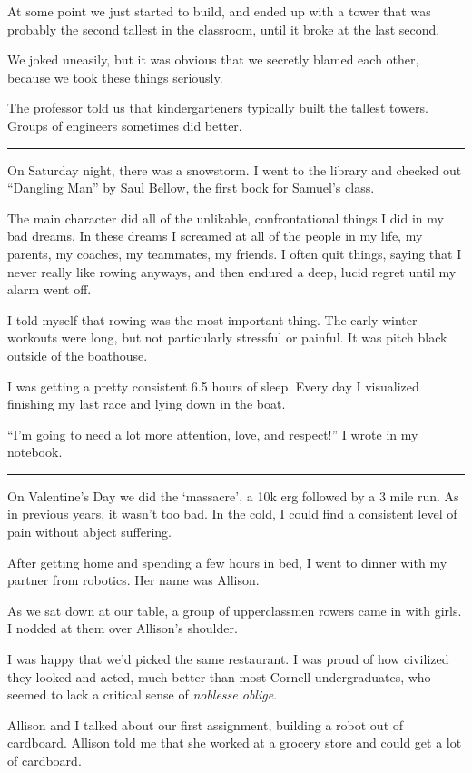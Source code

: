 At some point we just started to build, and ended up with a tower that was
probably the second tallest in the classroom, until it broke at the last second.

We joked uneasily, but it was obvious that we secretly blamed each other,
because we took these things seriously.

The professor told us that kindergarteners typically built the tallest towers.
Groups of engineers sometimes did better.

\plainfancybreak{12pt}{2}{}

On Saturday night, there was a snowstorm.  I went to the library and checked out
``Dangling Man'' by Saul Bellow, the first book for Samuel's class.

The main character did all of the unlikable, confrontational things I did in my
bad dreams.   In these dreams I screamed at all of the people in my life, my
parents, my coaches, my teammates, my friends.  I often quit things, saying that
I never really like rowing anyways, and then endured a deep, lucid regret until
my alarm went off.

I told myself that rowing was the most important thing.  The early winter
workouts were long, but not particularly stressful or painful.  It was pitch
black outside of the boathouse.

I was getting a pretty consistent 6.5 hours of sleep.  Every day I visualized
finishing my last race and lying down in the boat.  

``I'm going to need a lot more attention, love, and respect!'' I wrote in my
notebook. 

\plainfancybreak{12pt}{2}{}

On Valentine's Day we did the `massacre', a 10k erg followed by a 3 mile run.
As in previous years, it wasn't too bad.  In the cold, I could find a consistent
level of pain without abject suffering.

After getting home and spending a few hours in bed, I went to dinner with my
partner from robotics.  Her name was Allison. 

As we sat down at our table, a group of upperclassmen rowers came in with girls.
I nodded at them over Allison's shoulder.  

I was happy that we'd picked the same restaurant.  I was proud of how civilized
they looked and acted, much better than most Cornell undergraduates, who seemed
to lack a critical sense of \textit{noblesse oblige}.

Allison and I talked about our first assignment, building a robot out of
cardboard.  Allison told me that she worked at a grocery store and could get a
lot of cardboard.  

